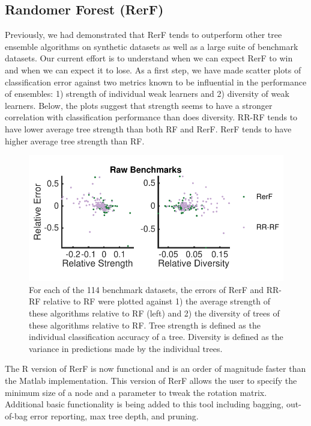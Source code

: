 \documentclass[simplex.tex]{subfiles}
\begin{document}
\subsection[Randomer Forest]{Randomer Forest (RerF)}

Previously, we had demonstrated that RerF tends to outperform other tree ensemble algorithms on synthetic datasets as well as a large suite of benchmark datasets. Our current effort is to understand when we can expect RerF to win and when we can expect it to lose. As a first step, we have made scatter plots of classification error against two metrics known to be influential in the performance of ensembles: 1) strength of individual weak learners and 2) diversity of weak learners. Below, the plots suggest that strength seems to have a stronger correlation with classification performance than does diversity. RR-RF tends to have lower average tree strength than both RF and RerF. RerF tends to have higher average tree strength than RF.

\begin{figure}[h!]
\begin{cframed}
\centering
\includegraphics[height=0.30\textheight]{../../figs/PAMI_fig10_strength_diversity_benchmark.pdf}
\caption{
For each of the 114 benchmark datasets, the errors of RerF and RR-RF relative to RF were plotted against 1) the average strength of these algorithms relative to RF (left) and 2) the diversity of trees of these algorithms relative to RF. Tree strength is defined as the individual classification accuracy of a tree. Diversity is defined as the variance in predictions made by the individual trees.
}
\label{fig:RefF3}
\end{cframed}
\end{figure}

The R version of RerF is now functional and is an order of magnitude faster than the Matlab implementation.  This version of RerF allows the user to specify the minimum size of a node and a parameter to tweak the rotation matrix.  Additional basic functionality is being added to this tool including bagging, out-of-bag error reporting, max tree depth, and pruning.  \\
\end{document}
